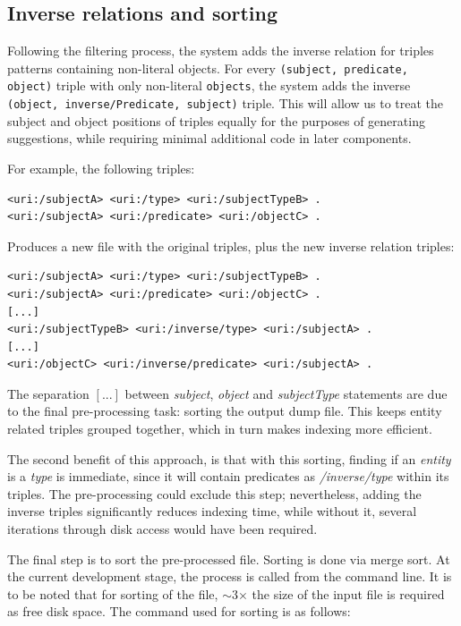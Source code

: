\subsection{Inverse relations and sorting}

Following the filtering process, the system adds the inverse relation for triples patterns containing non-literal objects. 
For every \texttt{(subject, predicate, object)} triple with only non-literal \texttt{objects}, the system adds the inverse \texttt{(object, inverse/Predicate, subject)} triple. This will allow us to treat the subject and object positions of triples equally for the purposes of generating suggestions, while requiring minimal additional code in later components.

\begin{example}
For example, the following triples:

\begin{verbatim}
<uri:/subjectA> <uri:/type> <uri:/subjectTypeB> .
<uri:/subjectA> <uri:/predicate> <uri:/objectC> .
\end{verbatim}

Produces a new file with the original triples, plus the new inverse relation triples:

\begin{verbatim}
<uri:/subjectA> <uri:/type> <uri:/subjectTypeB> .
<uri:/subjectA> <uri:/predicate> <uri:/objectC> .
[...]
<uri:/subjectTypeB> <uri:/inverse/type> <uri:/subjectA> .
[...]
<uri:/objectC> <uri:/inverse/predicate> <uri:/subjectA> .
\end{verbatim}

The separation $[...]$ between \textit{subject}, \textit{object} and \textit{subjectType} statements are due to the final pre-processing task: sorting the output dump file. 
This keeps entity related triples grouped together, which in turn makes indexing more efficient.

\end{example}

The second benefit of this approach, is that with this sorting, finding if an \textit{entity} is a \textit{type} is immediate, since it will contain predicates as \textit{/inverse/type} within its triples. 
The pre-processing could exclude this step; nevertheless, adding the inverse triples significantly reduces indexing time, while without it, several iterations through disk access would have been required. 

The final step is to sort the pre-processed file. Sorting is done via merge sort. At the current development stage, the process is called from the command line. It is to be noted that for sorting of the file, $\sim$3$\times$ the size of the input file is required as free disk space. The command used for sorting is as follows: 

